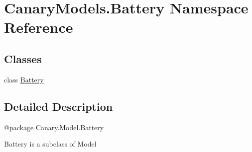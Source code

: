 \hypertarget{namespace_canary_models_1_1_battery}{\section{Canary\-Models.\-Battery Namespace Reference}
\label{namespace_canary_models_1_1_battery}
}
\subsection*{Classes}
\begin{DoxyCompactItemize}
\item 
class \hyperlink{class_canary_models_1_1_battery_1_1_battery}{Battery}
\end{DoxyCompactItemize}


\subsection{Detailed Description}
\begin{DoxyVerb}@package Canary.Model.Battery

Battery is a subclass of Model
\end{DoxyVerb}
 